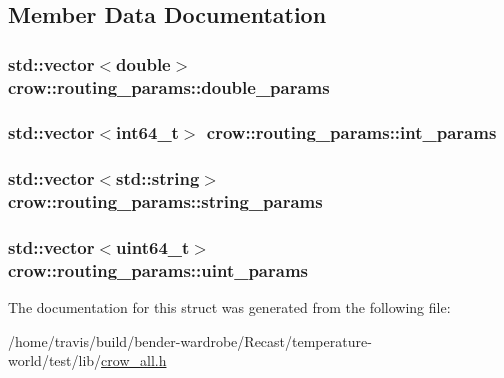\subsection{Member Data Documentation}
\hypertarget{structcrow_1_1routing__params_a090754b18f2bec903ae3db739a2b15c3}{
\subsubsection[{double\-\_\-params}]{\setlength{\rightskip}{0pt plus 5cm}std\-::vector$<$double$>$ crow\-::routing\-\_\-params\-::double\-\_\-params}}\label{structcrow_1_1routing__params_a090754b18f2bec903ae3db739a2b15c3}
\hypertarget{structcrow_1_1routing__params_a5d5bc98dbf4ab889061956effe901bcb}{
\subsubsection[{int\-\_\-params}]{\setlength{\rightskip}{0pt plus 5cm}std\-::vector$<$int64\-\_\-t$>$ crow\-::routing\-\_\-params\-::int\-\_\-params}}\label{structcrow_1_1routing__params_a5d5bc98dbf4ab889061956effe901bcb}
\hypertarget{structcrow_1_1routing__params_a77e66f381580c9faf2b0d06127f65142}{
\subsubsection[{string\-\_\-params}]{\setlength{\rightskip}{0pt plus 5cm}std\-::vector$<$std\-::string$>$ crow\-::routing\-\_\-params\-::string\-\_\-params}}\label{structcrow_1_1routing__params_a77e66f381580c9faf2b0d06127f65142}
\hypertarget{structcrow_1_1routing__params_ae221103dd3c93ee5731554512dd9f537}{
\subsubsection[{uint\-\_\-params}]{\setlength{\rightskip}{0pt plus 5cm}std\-::vector$<$uint64\-\_\-t$>$ crow\-::routing\-\_\-params\-::uint\-\_\-params}}\label{structcrow_1_1routing__params_ae221103dd3c93ee5731554512dd9f537}


The documentation for this struct was generated from the following file\-:\begin{DoxyCompactItemize}
\item 
/home/travis/build/bender-\/wardrobe/\-Recast/temperature-\/world/test/lib/\hyperlink{crow__all_8h}{crow\-\_\-all.\-h}\end{DoxyCompactItemize}
